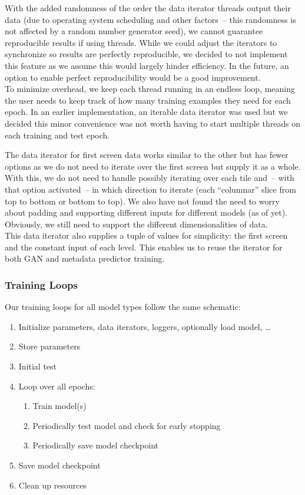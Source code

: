 With the added randomness of the order the data iterator threads
output their data (due to operating system scheduling and other
factors~-- this randomness is not affected by a random number generator
seed), we cannot guarantee reproducible results if using threads.
While we could adjust the iterators to synchronize so results are
perfectly reproducible, we decided to not implement this feature as we
assume this would largely hinder efficiency. In the future, an option
to enable perfect reproducibility would be a good improvement. \\
To minimize overhead, we keep each thread running in an endless loop,
meaning the user needs to keep track of how many training examples
they need for each epoch. In an earlier implementation, an iterable
data iterator was used but we decided this minor convenience was not
worth having to start multiple threads on each training and test
epoch.

The data iterator for first screen data works similar to the other but
has fewer options as we do not need to iterate over the first screen
but supply it as a whole. With this, we do not need to handle possibly
iterating over each tile and~-- with that option activated~-- in which
direction to iterate (each ``columnar'' slice from top to bottom or
bottom to top). We also have not found the need to worry about padding
and supporting different inputs for different models (as of yet).
Obviously, we still need to support the different dimensionalities of
data. \\
This data iterator also supplies a tuple of values for simplicity: the
first screen and the constant input of each level. This enables us to
reuse the iterator for both GAN and metadata predictor training.

\subsubsection{Training Loops}
\label{sec:training-loops}

Our training loops for all model types follow the same schematic:
\begin{enumerate}
\item Initialize parameters, data iterators, loggers, optionally load
  model, \dots
\item Store parameters
\item Initial test
\item Loop over all epochs:
  \begin{enumerate}
    \item Train model(s)
    \item Periodically test model and check for early stopping
    \item Periodically save model checkpoint
  \end{enumerate}
\item Save model checkpoint
\item Clean up resources
\end{enumerate}

